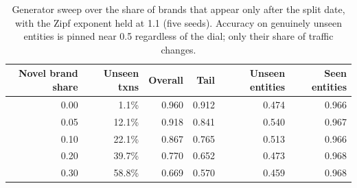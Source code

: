 \begin{table}[t]
\centering
\caption{Generator sweep over the share of brands that appear only after the split date, with the Zipf exponent held at 1.1 (five seeds). Accuracy on genuinely unseen entities is pinned near 0.5 regardless of the dial; only their share of traffic changes.}
\label{tab:novelshare}
\begin{tabular}{rrrrrr}
\toprule
Novel brand share & Unseen txns & Overall & Tail & Unseen entities & Seen entities\\
\midrule
0.00 & 1.1\% & 0.960 & 0.912 & 0.474 & 0.966 \\
0.05 & 12.1\% & 0.918 & 0.841 & 0.540 & 0.967 \\
0.10 & 22.1\% & 0.867 & 0.765 & 0.513 & 0.966 \\
0.20 & 39.7\% & 0.770 & 0.652 & 0.473 & 0.968 \\
0.30 & 58.8\% & 0.669 & 0.570 & 0.459 & 0.968 \\
\bottomrule
\end{tabular}
\end{table}
